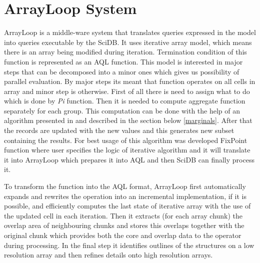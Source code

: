 \chapter{ArrayLoop System} \label{arrayLoop}
ArrayLoop is a middle-ware system that translates queries expressed in the model into queries executable by the SciDB. It uses iterative array model, which means there is an array being modified during iteration. Termination condition of this function is represented as an AQL function. This model is interested in major steps that can be decomposed into a minor ones which gives us possibility of parallel evaluation. By major steps its meant that function operates on all cells in array and minor step is otherwise. First of all there is need to assign what to do which is done by \textit{Pi} function. Then it is needed to compute aggregate function separately for each group.  This computation can be done with the help of an algorithm presented in \cite{marginals} and described in the section below \ref{marginals}. After that the records are updated with the new values and this generates new subset containing the results.
For best usage of this algorithm was developed FixPoint function where user specifies the logic of iterative algorithm and it will translate it into ArrayLoop which prepares it into AQL and then SciDB can finally process it.

To transform the function into the AQL format, ArrayLoop first automatically expands and rewrites the operation into an incremental implementation, if it is possible, and efficiently computes the last state of iterative array with the use of the updated cell in each iteration. Then it extracts (for each array chunk) the overlap area of neighbouring chunks and stores this overlaps together with the original chunk which provides both the core and overlap data to the operator during processing. In the final step it identifies outlines of the structures on a low resolution array and then refines details onto high resolution arrays. \cite{arrayloop}

